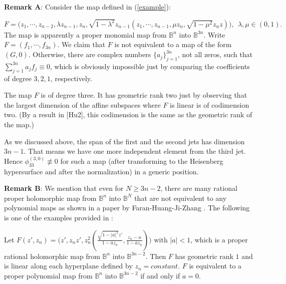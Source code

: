 \documentclass[12pt]{article}
\numberwithin{equation}{section}
\def\BB{{\mathbb B}}
\def\CC{{\mathbb C}}
\def\ov{\overline}
\begin{document}
\bigskip
{\bf Remark A}:  Consider the  map defined in (\ref{example}):

\medskip

$F=\big(z_1,\cdots,z_{n-2}, \lambda z_{n-1},z_n, \sqrt{1-\lambda^2}
z_{n-1}(z_1,\cdots,z_{n-1},\mu z_n, \sqrt{1-\mu^2} z_nz)\big),\ \
\lambda, \mu \in (0,1).$
\medskip
The map is apparently a proper monomial map from ${\BB}^n$ into
${\BB}^{3n}$. Write $F=(f_1,\cdots,f_{3n})$. We claim that $F$ is
not equivalent to a map of the form $(G,0)$. Otherwise, there are
complex numbers $\{a_j\}_{j=1}^{3n}$, not all zeros, such that
$\sum_{j=1}^{3n}a_j f_j\equiv 0$, which is obviously impossible just
by comparing the coefficients of degree $3,2,1$, respectively.


The map $F$ is of degree three. It has   geometric rank two just by
observing that the largest dimension of the  affine subspaces where
$F$ is linear is of codimension two. (By a result in [Hu2], this
codimension is the same as the geometric rank of the map.)

As we discussed above, the span of the first and the second jets has
dimension $3n-1$. That means we have one more independent element
from the third jet.
Hence $\phi^{(3,0)}_{33}\not \equiv 0$ for such a map (after
transforming to the Heisenberg hypersurface and after the
normalization) in a generic position.

\bigskip
{\bf Remark B}:  We mention that even for  $N\ge 3n-2$, there are
many rational proper holomorphic map from ${\BB}^n$ into ${\BB}^N$
that are not equivalent to any polynomial maps as shown in a paper
by Faran-Huang-Ji-Zhang \cite{FHJZ}. The following is one of the examples
provided in \cite{FHJZ}:

\medskip
 Let $ F(z',z_n)=\bigg(z', z_nz', z_n^2(\frac{\sqrt{1-|a|^2}z'}{1- \ov a
z_n}, \frac{z_n - a}{1- \ov a z_n}) \bigg)$ with $|a|<1$, which is a
proper rational holomorphic  map  from $\BB^n$ into  $\BB^{3n-2}$.
Then $F$ has geometric rank $1$ and is linear along each hyperplane
defined by $z_n = constant$. $F$ is   equivalent to a proper
polynomial map from ${\BB}^n$ into  ${\BB}^{3n-2}$
 if and only if $a = 0$.
\end{document}
